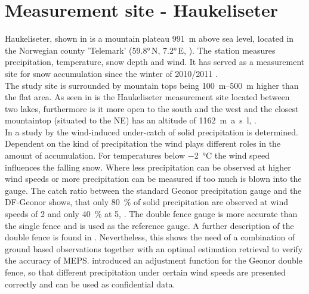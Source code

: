 \section{Measurement site - Haukeliseter}
\label{sec:site}

Haukeliseter, shown in  is a mountain plateau \SI{991}{\m} above sea level, located in the Norwegian county 'Telemark' (\ang{59.8}\,N, \ang{7.2}\,E, ). The station measures precipitation, temperature, snow depth and wind. It has served as a measurement site for snow accumulation since the winter of 2010/2011 \citep{wolff_new_2010, wolff_measurements_2013, wolff_derivation_2015}. \\
The study site is surrounded by mountain tops being \SIrange{100}{500}{\metre} higher than the flat area. As seen in  is the Haukeliseter measurement site located between two lakes, furthermore is it more open to the south and the west and the closest mountaintop (situated to the NE) has an altitude of \SI{1162}{\metre a.s.l}, \citep{wolff_derivation_2015}.
\\
In a study by \cite{wolff_derivation_2015} the wind-induced under-catch of solid precipitation is determined. Dependent on the kind of precipitation the wind plays different roles in the amount of accumulation. For temperatures below \SI{-2}{\celsius} the wind speed influences the falling snow. Where less precipitation can be observed at higher wind speeds or more precipitation can be measured if too much is blown into the gauge. The catch ratio between the standard Geonor precipitation gauge and the DF-Geonor shows, that only \SI{80}{\percent} of solid precipitation are observed at wind speeds of \SI{2}{\mPs} and only \SI{40}{\percent} at \SI{5}{\mPs}, \cite[Figure 5 in][]{wolff_derivation_2015}. The double fence gauge is more accurate than the single fence and is used as the reference gauge. A further description of the double fence is found in . 
Nevertheless, this shows the need of a combination of ground based observations together with an optimal estimation retrieval to verify the accuracy of MEPS. \cite{wolff_derivation_2015} introduced an adjustment function for the Geonor double fence, so that different precipitation under certain wind speeds are presented correctly and can be used as confidential data. 